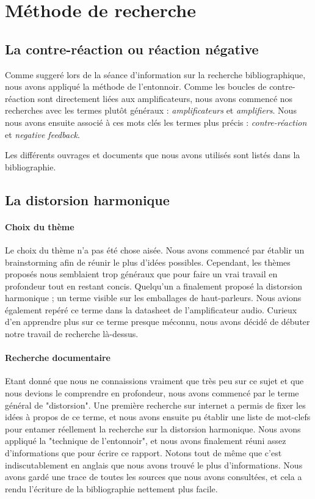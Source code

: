 

\section{Méthode de recherche}

\subsection{La contre-réaction ou réaction négative}
Comme suggeré lors de la séance d'information sur la recherche bibliographique,
nous avons appliqué la méthode de l'entonnoir. Comme les boucles de contre-réaction 
sont directement liées aux amplificateurs, nous avons commencé nos recherches avec 
les termes plutôt généraux : \textit{amplificateurs} et \textit{amplifiers}. Nous 
nous avons ensuite associé à ces mots clés les termes plus précis : \textit{contre-réaction}
et \textit{negative feedback}.

Les différents ouvrages et documents que nous avons utilisés sont listés dans la bibliographie.

\subsection{La distorsion harmonique}

\paragraph{Choix du thème}
Le choix du thème n'a pas été chose aisée. Nous avons commencé par établir un brainstorming afin de réunir 
le plus d'idées possibles. Cependant, les thèmes proposés nous semblaient trop généraux que pour faire un vrai 
travail en profondeur tout en restant concis. Quelqu'un a finalement proposé la distorsion harmonique ; un 
terme visible sur les emballages de haut-parleurs. Nous avions également repéré ce terme dans la datasheet 
de l'amplificateur audio. Curieux d'en apprendre plus sur ce terme presque méconnu, 
nous avons décidé de débuter notre travail de recherche là-dessus.

\paragraph{Recherche documentaire}
Etant donné que nous ne connaissions vraiment que très peu sur ce sujet et que nous 
devions le comprendre en profondeur, nous avons commencé par le terme général de "distorsion".
Une première recherche sur internet a permis de fixer les idées à propos de ce terme, et nous 
avons ensuite pu établir une liste de mot-clefs pour entamer réellement la recherche sur la 
distorsion harmonique. Nous avons appliqué la "technique de l'entonnoir", et nous avons finalement 
réuni assez d'informations que pour écrire ce rapport. Notons tout de même que c'est indiscutablement
en anglais que nous avons 
trouvé le plus d'informations. Nous avons gardé une trace de toutes les sources que nous avons 
consultées, et cela a rendu l'écriture de la bibliographie nettement plus facile.


